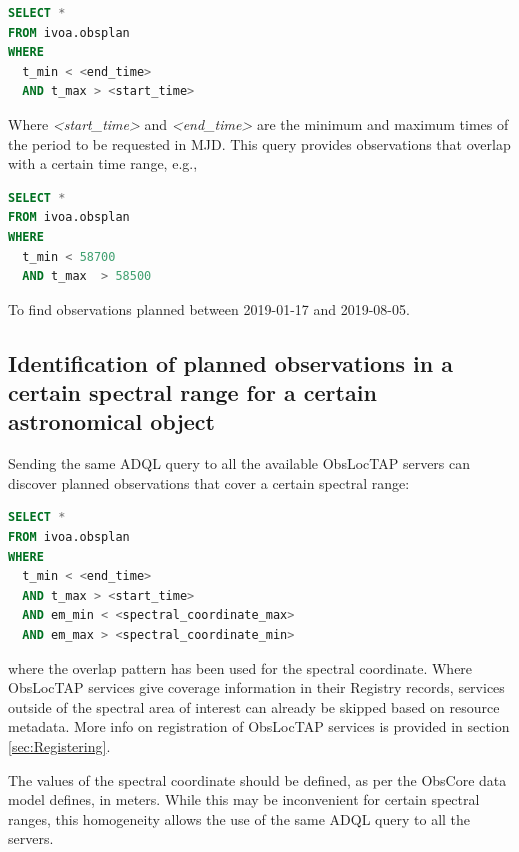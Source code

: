 \documentclass[11pt,a4paper]{ivoa}
\begin{document}
\begin{lstlisting}[language=SQL]
SELECT * 
FROM ivoa.obsplan 
WHERE
  t_min < <end_time>
  AND t_max > <start_time>
\end{lstlisting}
Where \textit{<start\_time>} and \textit{<end\_time> }are the minimum and
maximum times of the period to be requested in MJD. This query provides
observations that overlap with a certain time range, e.g.,

\begin{lstlisting}[language=SQL]
SELECT *
FROM ivoa.obsplan
WHERE
  t_min < 58700
  AND t_max  > 58500
\end{lstlisting}

To find observations planned between 2019-01-17 and 2019-08-05.

\subsection{Identification of planned observations in a certain spectral range
for a certain astronomical object}
Sending the same ADQL query to all the available ObsLocTAP servers can discover
planned observations that cover a certain spectral range:

\begin{lstlisting}[language=SQL]
SELECT *
FROM ivoa.obsplan
WHERE
  t_min < <end_time>
  AND t_max > <start_time>
  AND em_min < <spectral_coordinate_max>
  AND em_max > <spectral_coordinate_min>
\end{lstlisting}
where the overlap pattern has been used for the spectral coordinate.
Where ObsLocTAP services give coverage information in their Registry records,
services outside of the spectral area of interest can already be skipped based
on resource metadata. More info on registration of ObsLocTAP services is provided
in section \ref{sec:Registering}.
\par

The values of the spectral coordinate should be defined, as per the ObsCore data
model defines, in meters. While this may be inconvenient for certain spectral
ranges, this homogeneity allows the use of the same ADQL query to all the
servers.
\end{document}
